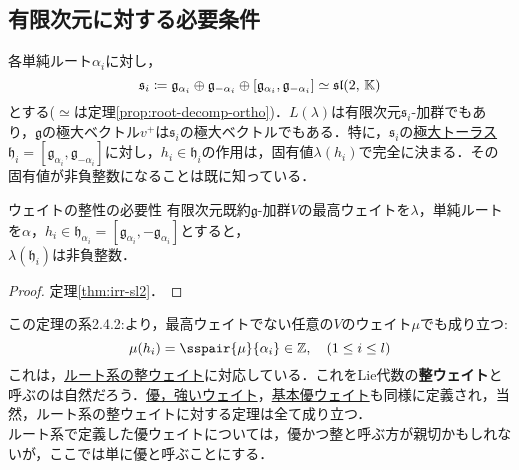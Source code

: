 \documentclass[rep_main]{subfiles}
\begin{document}
\subsection{有限次元に対する必要条件}
各単純ルート$\alpha_i$に対し，
	\begin{equation}
		\mathfrak{s}_i \coloneqq \mathfrak{g}_{\alpha_i} \oplus \mathfrak{g}_{-\alpha_i} \oplus [\mathfrak{g}_{\alpha_i}, \mathfrak{g}_{-\alpha_i}] \simeq \mathfrak{sl}(2,\, \mathbb{K})
	\end{equation}
	とする($\simeq$は定理\ref{prop:root-decomp-ortho})．$L(\lambda)$は有限次元$\mathfrak{s}_i$-加群でもあり，$\mathfrak{g}$の極大ベクトル$v^+$は$\mathfrak{s}_i$の極大ベクトルでもある．特に，$\mathfrak{s}_i$の\hyperref[def:toral-subLieAlg]{極大トーラス}$\mathfrak{h}_i = [\mathfrak{g}_{\alpha_i}, \mathfrak{g}_{-\alpha_i}]$に対し，$h_i \in \mathfrak{h}_i$の作用は，固有値$\lambda(h_i)$で完全に決まる．その固有値が非負整数になることは既に知っている．
\begin{mytheo}[label=thm:necessary-for-finite]{ウェイトの整性の必要性}
	有限次元既約$\mathfrak{g}$-加群$V$の最高ウェイトを$\lambda$，単純ルートを$\alpha$，$h_i \in \mathfrak{h}_{\alpha_i} = [\mathfrak{g}_{\alpha_i}, -\mathfrak{g}_{\alpha_i}]$とすると，\\
	$\lambda(\mathfrak{h}_i)$は非負整数．
\end{mytheo}
\begin{proof}
	定理\ref{thm:irr-sl2}．
\end{proof}
この定理の系2.4.2:より，最高ウェイトでない任意の$V$のウェイト$\mu$でも成り立つ:
\begin{equation}
	\label{eq:int-weight}
	\mu(h_i) = \sspair{\mu}{\alpha_i} \in \mathbb{Z},\quad  (1 \leq i \leq l)
\end{equation}
これは，\hyperref[def:root-lattice]{ルート系の整ウェイト}に対応している．これをLie代数の\textbf{整ウェイト}と呼ぶのは自然だろう．\hyperref[def:domweight]{優，強いウェイト}，\hyperref[def:fundamental-weight]{基本優ウェイト}も同様に定義され，当然，ルート系の整ウェイトに対する定理は全て成り立つ．\\
ルート系で定義した優ウェイトについては，優かつ整と呼ぶ方が親切かもしれないが，ここでは単に優と呼ぶことにする．
\end{document}
